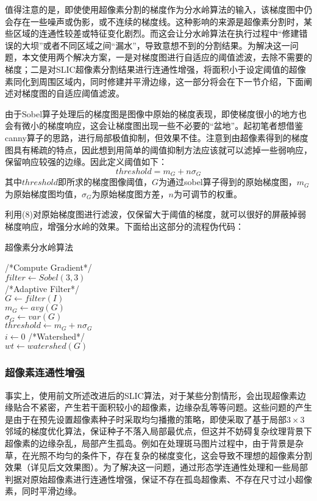 \documentclass[UTF8]{ctexart}
\begin{document}
值得注意的是，即使使用超像素分割的梯度作为分水岭算法的输入，该梯度图中仍会存在一些噪声或伪影，或不连续的梯度线。这种影响的来源是超像素分割时，某些区域的连通性较差或特征变化剧烈。而这会让分水岭算法在执行过程中“修建错误的大坝”或者不同区域之间“漏水”，导致意想不到的分割结果。为解决这一问题，本文使用两个解决方案，一是对梯度图进行自适应的阈值滤波，去除不需要的梯度；二是对SLIC超像素分割结果进行连通性增强，将面积小于设定阈值的超像素同化到周围区域内，同时修建并平滑边缘，这一部分将会在下一节介绍，下面阐述对梯度图的自适应阈值滤波。

由于Sobel算子处理后的梯度图是图像中原始的梯度表现，即使梯度很小的地方也会有微小的梯度响应，这会让梯度图出现一些不必要的“盆地”。起初笔者想借鉴canny算子的思路，进行局部极值抑制，但效果不佳。注意到由超像素得到的梯度图具有稀疏的特点，因此想到用简单的阈值抑制方法应该就可以滤掉一些弱响应，保留响应较强的边缘。因此定义阈值如下：
\begin{equation}
    threshold = m_G+n\sigma_G
\end{equation}
其中$threshold$即所求的梯度图像阈值，$G$为通过sobel算子得到的原始梯度图，$m_G$为原始梯度图均值，$\sigma_G$为原始梯度图方差，$n$为可调节的权重。

利用(8)对原始梯度图进行滤波，仅保留大于阈值的梯度，就可以很好的屏蔽掉弱梯度响应，增强分水岭的效果。下面给出这部分的流程伪代码：
\begin{algorithm}[H]
    \caption{超像素分水岭算法}
    /*Compute Gradient*/\\
    $filter \leftarrow Sobel(3,3)$\\
    /*Adaptive Filter*/\\
    $G \leftarrow filter(I)$\\
    $m_G \leftarrow avg(G)$\\
    $\sigma_G \leftarrow var(G)$\\
    $threshold \leftarrow m_G + n \sigma_G$\\
    {
        {
            $i \leftarrow 0$
        }
    }
    /*Watershed*/\\
    $wt \leftarrow watershed(G)$


\end{algorithm}

\subsubsection{超像素连通性增强}
事实上，使用前文所述改进后的SLIC算法，对于某些分割情形，会出现超像素边缘贴合不紧密，产生若干面积较小的超像素，边缘杂乱等等问题。这些问题的产生是由于在预先设置超像素种子时采取均匀播撒的策略，即使采取了基于局部$3\times3$邻域的梯度优化算法，保证种子不落入局部最优点，但这并不妨碍复杂纹理背景下超像素的边缘杂乱，局部产生孤岛。例如在处理斑马图片过程中，由于背景是杂草，在光照不均匀的条件下，存在复杂的梯度变化，这会导致不理想的超像素分割效果（详见后文效果图）。为了解决这一问题，通过形态学连通性处理和一些局部判据对原始超像素进行连通性增强，保证不存在孤岛超像素、不存在尺寸过小超像素，同时平滑边缘。
\end{document}
